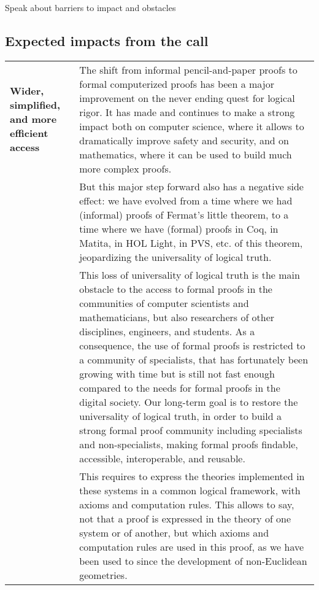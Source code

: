{\color{red} Speak about barriers to impact and obstacles}

\subsection*{Expected impacts from the call}

\begin{longtable}{|p{}|p{}|}
\hline
{\bf Wider, simplified, and more efficient access}&
The shift from informal pencil-and-paper proofs to formal computerized
proofs has been a major improvement on the never ending quest for
logical rigor. It has made and continues to make a strong impact both
on computer science, where it allows to dramatically improve safety
and security, and on mathematics, where it can be used to build much
more complex proofs.\\
&
\hspace{0.4cm}
But this major step forward also has a negative side effect: we have
evolved from a time where we had (informal) proofs of Fermat's little
theorem, to a time where we have (formal) proofs in Coq, in Matita, in
HOL Light, in PVS, etc.  of this theorem, jeopardizing the
universality of logical truth.\\
&
\hspace*{0.4cm} This loss of universality of logical truth is the main
obstacle to the access to formal proofs in the communities of computer
scientists and mathematicians, but also researchers of other
disciplines, engineers, and students. As a consequence, the use of
formal proofs is restricted to a community of specialists, that has
fortunately been growing with time but is still not fast enough
compared to the needs for formal proofs in the digital society.  Our
long-term goal is to restore the universality of logical truth, in
order to build a strong formal proof community including specialists
and non-specialists, making formal proofs findable, accessible,
interoperable, and reusable.\\ &
\hspace{0.4cm}
This requires to express the theories implemented in these systems in
a common logical framework, with axioms and computation rules. This allows
to say, not that a proof is expressed in the theory of one
system or of another, but which axioms and computation rules are used in
this proof, as we have been used to since the development of
non-Euclidean geometries.


\end{longtable}
